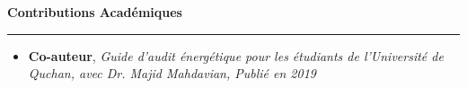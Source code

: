 \documentclass[a4paper]{letter}
\newcommand{\divider}{\rule{\linewidth}{0.9pt}}
\begin{document}
\begin{minipage}[t]{0.67\textwidth}
{\large \textbf{Contributions Académiques}}
\divider
\vspace{3mm}
\begin{itemize}
    \footnotesize \item {\textbf{Co-auteur}, \textit{Guide d’audit énergétique pour les étudiants de l’Université de Quchan, avec Dr. Majid Mahdavian, Publié en 2019}}


\end{itemize}


    
    




\end{minipage}
\end{document}

